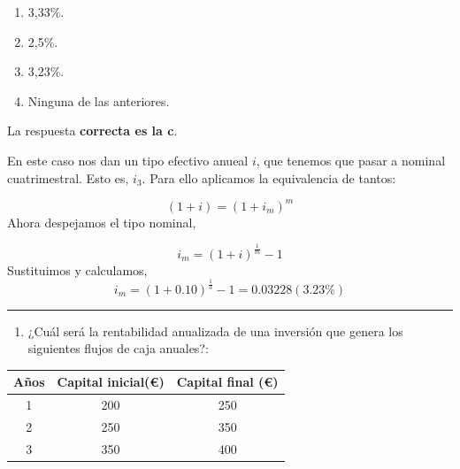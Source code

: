 \documentclass[
  letterpaper,
  DIV=11,
  numbers=noendperiod]{scrreprt}
\providecommand{\tightlist}{%
  \setlength{\itemsep}{0pt}\setlength{\parskip}{0pt}}\usepackage{longtable,booktabs,array}
\begin{document}
\begin{enumerate}
\def\labelenumi{\alph{enumi}.}
\item
  3,33\%.
\item
  2,5\%.
\item
  3,23\%.
\item
  Ninguna de las anteriores.
\end{enumerate}

\begin{tcolorbox}[enhanced jigsaw, left=2mm, opacityback=0, colback=white, breakable, arc=.35mm, bottomrule=.15mm, rightrule=.15mm, toprule=.15mm, leftrule=.75mm, colframe=quarto-callout-tip-color-frame]
\begin{minipage}[t]{5.5mm}
\textcolor{quarto-callout-tip-color}{\faLightbulb}
\end{minipage}%
\begin{minipage}[t]{\textwidth - 5.5mm}

La respuesta \textbf{correcta es la c}.

En este caso nos dan un tipo efectivo anueal \(i\), que tenemos que
pasar a nominal cuatrimestral. Esto es, \(i_3\). Para ello aplicamos la
equivalencia de tantos:

\[\left(1+i\right)=\left(1+i_m\right)^m\] Ahora despejamos el tipo
nominal,

\[i_m=\left(1+i\right)^{\frac{1 }{m }}-1\] Sustituimos y calculamos,
\[i_m=\left(1+0.10\right)^{\frac{1 }{3 }}-1=0.03228(3.23\%)\]

\end{minipage}%
\end{tcolorbox}

\begin{center}\rule{0.5\linewidth}{0.5pt}\end{center}

\begin{enumerate}
\def\labelenumi{\arabic{enumi}.}
\setcounter{enumi}{57}
\tightlist
\item
  ¿Cuál será la rentabilidad anualizada de una inversión que genera los
  siguientes flujos de caja anuales?:
\end{enumerate}

\begin{longtable}[]{@{}ccc@{}}
\toprule()
\textbf{Años} & \textbf{Capital inicial(€)} & \textbf{Capital final
(€)} \\
\midrule()
\endhead
1 & 200 & 250 \\
2 & 250 & 350 \\
3 & 350 & 400 \\
\bottomrule()
\end{longtable}
\end{document}
